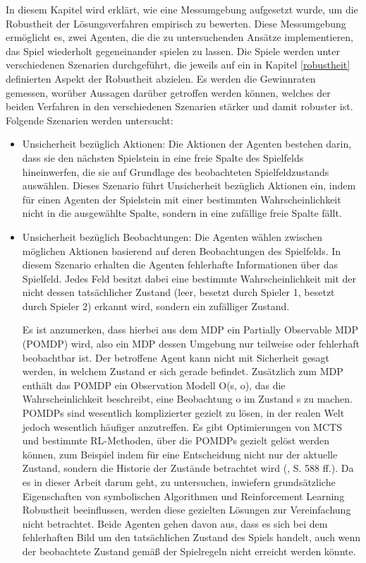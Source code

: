 In diesem Kapitel wird erklärt, wie eine Messumgebung aufgesetzt wurde, um die Robustheit der Lösungsverfahren empirisch zu bewerten. Diese Messumgebung ermöglicht es, zwei Agenten, die die zu untersuchenden Ansätze implementieren, das Spiel wiederholt gegeneinander spielen zu lassen. Die Spiele werden unter verschiedenen Szenarien durchgeführt, die jeweils auf ein in Kapitel \ref{robustheit} definierten Aspekt der Robustheit abzielen. Es werden die Gewinnraten gemessen, worüber Aussagen darüber getroffen werden können, welches der beiden Verfahren in den verschiedenen Szenarien stärker und damit robuster ist. Folgende Szenarien werden untersucht:

\begin{itemize}
	\item Unsicherheit bezüglich Aktionen: Die Aktionen der Agenten bestehen darin, dass sie den nächsten Spielstein in eine freie Spalte des Spielfelds hineinwerfen, die sie auf Grundlage des beobachteten Spielfeldzustands auswählen. Dieses Szenario führt Unsicherheit bezüglich Aktionen ein, indem für einen Agenten der Spielstein mit einer bestimmten Wahrscheinlichkeit nicht in die ausgewählte Spalte, sondern in eine zufällige freie Spalte fällt.
	
	\item Unsicherheit bezüglich Beobachtungen: Die Agenten wählen zwischen möglichen Aktionen basierend auf deren Beobachtungen des Spielfelds. In diesem Szenario erhalten die Agenten fehlerhafte Informationen über das Spielfeld. Jedes Feld besitzt dabei eine bestimmte Wahrscheinlichkeit mit der nicht dessen tatsächlicher Zustand (leer, besetzt durch Spieler 1, besetzt durch Spieler 2) erkannt wird, sondern ein zufälliger Zustand.
	
	Es ist anzumerken, dass hierbei aus dem MDP ein Partially Observable MDP (POMDP) wird, also ein MDP dessen Umgebung nur teilweise oder fehlerhaft beobachtbar ist. Der betroffene Agent kann nicht mit Sicherheit gesagt werden, in welchem Zustand er sich gerade befindet. Zusätzlich zum MDP enthält das POMDP ein Observation Modell O(s, o), das die Wahrscheinlichkeit beschreibt, eine Beobachtung o im Zustand s zu machen. POMDPs sind wesentlich komplizierter gezielt zu lösen, in der realen Welt jedoch wesentlich häufiger anzutreffen. Es gibt Optimierungen von MCTS und bestimmte RL-Methoden, über die POMDPs gezielt gelöst werden können, zum Beispiel indem für eine Entscheidung nicht nur der aktuelle Zustand, sondern die Historie der Zustände betrachtet wird (\cite{Russell.2020}, S. 588 ff.). Da es in dieser Arbeit darum geht, zu untersuchen, inwiefern grundsätzliche Eigenschaften von symbolischen Algorithmen und Reinforcement Learning Robustheit beeinflussen, werden diese gezielten Lösungen zur Vereinfachung nicht betrachtet. Beide Agenten gehen davon aus, dass es sich bei dem fehlerhaften Bild um den tatsächlichen Zustand des Spiels handelt, auch wenn der beobachtete Zustand gemäß der Spielregeln nicht erreicht werden könnte.
	

\end{itemize}
